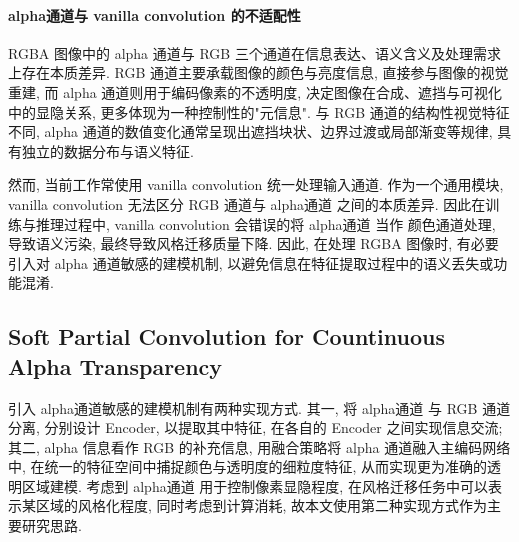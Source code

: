 \paragraph{alpha通道与 vanilla convolution 的不适配性}

RGBA 图像中的 alpha 通道与 RGB 三个通道在信息表达、语义含义及处理需求上存在本质差异. RGB 通道主要承载图像的颜色与亮度信息, 直接参与图像的视觉重建, 而 alpha 通道则用于编码像素的不透明度, 决定图像在合成、遮挡与可视化中的显隐关系, 更多体现为一种控制性的"元信息". 与 RGB 通道的结构性视觉特征不同, alpha 通道的数值变化通常呈现出遮挡块状、边界过渡或局部渐变等规律, 具有独立的数据分布与语义特征. 

然而, 当前工作常使用 vanilla convolution 统一处理输入通道. 作为一个通用模块, vanilla convolution 无法区分 RGB 通道与 alpha通道 之间的本质差异. 因此在训练与推理过程中, vanilla convolution 会错误的将 alpha通道 当作 颜色通道处理, 导致语义污染, 最终导致风格迁移质量下降. 因此, 在处理 RGBA 图像时, 有必要引入对 alpha 通道敏感的建模机制, 以避免信息在特征提取过程中的语义丢失或功能混淆.


\subsection{Soft Partial Convolution for Countinuous Alpha Transparency}

引入 alpha通道敏感的建模机制有两种实现方式. 其一, 将 alpha通道 与 RGB 通道分离, 分别设计 Encoder, 以提取其中特征, 在各自的 Encoder 之间实现信息交流; 其二, alpha 信息看作 RGB 的补充信息, 用融合策略将 alpha 通道融入主编码网络中, 在统一的特征空间中捕捉颜色与透明度的细粒度特征, 从而实现更为准确的透明区域建模. 考虑到 alpha通道 用于控制像素显隐程度, 在风格迁移任务中可以表示某区域的风格化程度, 同时考虑到计算消耗, 故本文使用第二种实现方式作为主要研究思路.